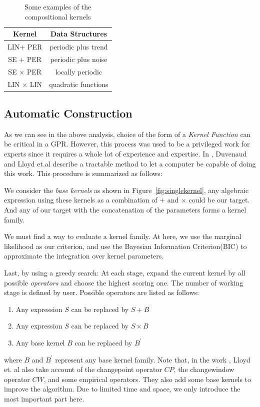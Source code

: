 \begin{table}[htp]
\centering
{\small
\begin{tabular}{c|c}
    \hline
    \textbf{Kernel} & \textbf{Data Structures} \\ 
    \hline
	   LIN+ PER & periodic plus trend\\
	   SE + PER & periodic plus noise\\
	   SE $\times$ PER & locally periodic\\
	   LIN $\times$ LIN & quadratic functions\\
	   \hline
\end{tabular}
}
\caption{Some examples of the compositional kernels}
\label{tab:compKernel}
\end{table}


\subsection{Automatic Construction} \label{sec:autokernel}
As we can see in the above analysis, choice of the form of a \emph{Kernel Function} can be critical in a GPR. However, this process was used to be a privileged work for experts since it requires a whole lot of experience and expertise. In \cite{duvenaud2013structure,lloyd2014automatic,duvenaud2014automatic}, Duvenaud and Lloyd et.al describe a tractable method to let a computer be capable of doing this work.
This procedure is summarized as follows:

We consider the \emph{base kernels} as shown in Figure~\ref{fig:singlekernel}, any algebraic expression using these kernels as a combination of $+$ and $\times$ could be our target. And any of our target with the concatenation of the parameters forms a kernel family.

We must find a way to evaluate a kernel family. At here, we use the marginal likelihood\cite{blumer1987occam} as our criterion, and use the Bayesian Information Criterion(BIC)\cite{schwarz1978estimating} to approximate the integration over kernel parameters.

Last, by using a greedy search: At each stage, expand the current kernel by all possible \emph{operators}
and choose the highest scoring one. The number of working stage is defined by user.
Possible operators are listed as follows:
\begin{enumerate}
	\item Any expression $S$ can be replaced by $S + B$
	\item Any expression $S$ can be replaced by $S \times B$
	\item Any base kernel $B$ can be replaced by $B^{'}$
\end{enumerate}
where $B$ and $B^{'}$ represent any base kernel family. Note that, in the work \cite{lloyd2014automatic}, Lloyd et. al also take account of the changepoint operator $CP$, the changewindow operator $CW$, and some empirical operators. They also add some base kernels to improve the algorithm. Due to limited time and space, we only introduce the most important part here.

